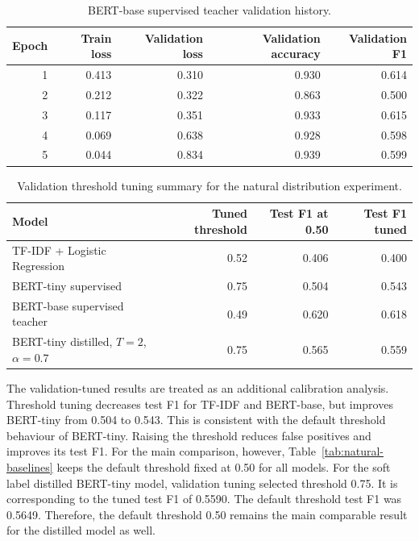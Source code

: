 \documentclass[pdflatex,sn-mathphys-num]{sn-jnl}
\begin{document}
\begin{table}[htbp]
\caption{BERT-base supervised teacher validation history.}\label{tab:bert-base-history}
\centering
\begin{tabular}{rrrrr}
\toprule
Epoch & Train loss & Validation loss & Validation accuracy & Validation F1 \\
\midrule
1 & 0.413 & 0.310 & 0.930 & 0.614 \\
2 & 0.212 & 0.322 & 0.863 & 0.500 \\
3 & 0.117 & 0.351 & 0.933 & 0.615 \\
4 & 0.069 & 0.638 & 0.928 & 0.598 \\
5 & 0.044 & 0.834 & 0.939 & 0.599 \\
\bottomrule
\end{tabular}
\end{table}

\begin{table}[htbp]
\caption{Validation threshold tuning summary for the natural distribution experiment.}\label{tab:threshold-tuning}
\centering
\small
\begin{tabular}{@{}lrrr@{}}
\toprule
Model & Tuned threshold & Test F1 at 0.50 & Test F1 tuned \\
\midrule
TF-IDF + Logistic Regression & 0.52 & 0.406 & 0.400 \\
BERT-tiny supervised & 0.75 & 0.504 & 0.543 \\
BERT-base supervised teacher & 0.49 & 0.620 & 0.618 \\
BERT-tiny distilled, $T=2$, $\alpha=0.7$ & 0.75 & 0.565 & 0.559 \\
\bottomrule
\end{tabular}
\end{table}

The validation-tuned results are treated as an additional calibration analysis.
Threshold tuning decreases test F1 for TF-IDF and BERT-base, but improves BERT-tiny from 0.504 to 0.543.
This is consistent with the default threshold behaviour of BERT-tiny.
Raising the threshold reduces false positives and improves its test F1.
For the main comparison, however, Table~\ref{tab:natural-baselines} keeps the default threshold fixed at 0.50 for all models.
For the soft label distilled BERT-tiny model, validation tuning selected threshold 0.75.
It is corresponding to the tuned test F1 of 0.5590.
The default threshold test F1 was 0.5649.
Therefore, the default threshold 0.50 remains the main comparable result for the distilled model as well.
\end{document}
